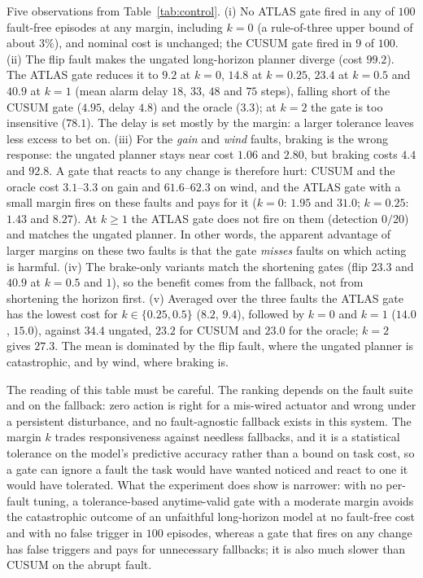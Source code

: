 

Five observations from Table~\ref{tab:control}. (i) No ATLAS gate fired in any of $100$ fault-free episodes at any margin, including $k=0$ (a rule-of-three upper bound of about $3\%$), and nominal cost is unchanged; the CUSUM gate fired in $9$ of $100$.
(ii) The flip fault makes the ungated long-horizon planner diverge (cost $99.2$). The ATLAS gate reduces it to $9.2$ at $k=0$, $14.8$ at $k=0.25$, $23.4$ at $k=0.5$ and $40.9$ at $k=1$ (mean alarm delay $18$, $33$, $48$ and $75$ steps), falling short of the CUSUM gate ($4.95$, delay $4.8$) and the oracle ($3.3$); at $k=2$ the gate is too insensitive ($78.1$). The delay is set mostly by the margin: a larger tolerance leaves less excess to bet on.
(iii) For the \emph{gain} and \emph{wind} faults, braking is the wrong response: the ungated planner stays near cost $1.06$ and $2.80$, but braking costs $4.4$ and $92.8$. A gate that reacts to any change is therefore hurt: CUSUM and the oracle cost $3.1$--$3.3$ on gain and $61.6$--$62.3$ on wind, and the ATLAS gate with a small margin fires on these faults and pays for it ($k=0$: $1.95$ and $31.0$; $k=0.25$: $1.43$ and $8.27$). At $k\ge1$ the ATLAS gate does not fire on them (detection $0/20$) and matches the ungated planner. In other words, the apparent advantage of larger margins on these two faults is that the gate \emph{misses} faults on which acting is harmful.
(iv) The brake-only variants match the shortening gates (flip $23.3$ and $40.9$ at $k=0.5$ and $1$), so the benefit comes from the fallback, not from shortening the horizon first.
(v) Averaged over the three faults the ATLAS gate has the lowest cost for $k\in\{0.25,0.5\}$ ($8.2$, $9.4$), followed by $k=0$ and $k=1$ ($14.0$, $15.0$), against $34.4$ ungated, $23.2$ for CUSUM and $23.0$ for the oracle; $k=2$ gives $27.3$. The mean is dominated by the flip fault, where the ungated planner is catastrophic, and by wind, where braking is.

The reading of this table must be careful. The ranking depends on the fault suite and on the fallback: zero action is right for a mis-wired actuator and wrong under a persistent disturbance, and no fault-agnostic fallback exists in this system. The margin $k$ trades responsiveness against needless fallbacks, and it is a statistical tolerance on the model's predictive accuracy rather than a bound on task cost, so a gate can ignore a fault the task would have wanted noticed and react to one it would have tolerated. What the experiment does show is narrower: with no per-fault tuning, a tolerance-based anytime-valid gate with a moderate margin avoids the catastrophic outcome of an unfaithful long-horizon model at no fault-free cost and with no false trigger in $100$ episodes, whereas a gate that fires on any change has false triggers and pays for unnecessary fallbacks; it is also much slower than CUSUM on the abrupt fault.

